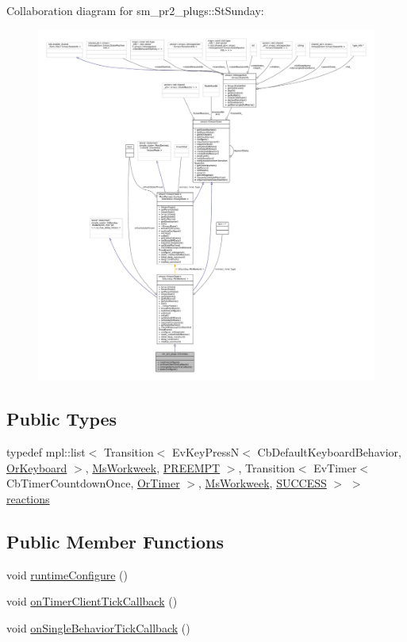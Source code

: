 Collaboration diagram for sm\+\_\+pr2\+\_\+plugs\+:\+:St\+Sunday\+:
\nopagebreak
\begin{figure}[H]
\begin{center}
\leavevmode
\includegraphics[width=350pt]{structsm__pr2__plugs_1_1StSunday__coll__graph}
\end{center}
\end{figure}
\subsection*{Public Types}
\begin{DoxyCompactItemize}
\item 
typedef mpl\+::list$<$ Transition$<$ Ev\+Key\+PressN$<$ Cb\+Default\+Keyboard\+Behavior, \hyperlink{classsm__pr2__plugs_1_1OrKeyboard}{Or\+Keyboard} $>$, \hyperlink{classsm__pr2__plugs_1_1MsWorkweek}{Ms\+Workweek}, \hyperlink{classPREEMPT}{P\+R\+E\+E\+M\+PT} $>$, Transition$<$ Ev\+Timer$<$ Cb\+Timer\+Countdown\+Once, \hyperlink{classsm__pr2__plugs_1_1OrTimer}{Or\+Timer} $>$, \hyperlink{classsm__pr2__plugs_1_1MsWorkweek}{Ms\+Workweek}, \hyperlink{classSUCCESS}{S\+U\+C\+C\+E\+SS} $>$ $>$ \hyperlink{structsm__pr2__plugs_1_1StSunday_acff71e969a008925b664a7eb033b457a}{reactions}
\end{DoxyCompactItemize}
\subsection*{Public Member Functions}
\begin{DoxyCompactItemize}
\item 
void \hyperlink{structsm__pr2__plugs_1_1StSunday_a184a3541f7e54fe67c17d078ef20dcde}{runtime\+Configure} ()
\item 
void \hyperlink{structsm__pr2__plugs_1_1StSunday_a8edc04f7306696db9c7a9972aaa5a2e0}{on\+Timer\+Client\+Tick\+Callback} ()
\item 
void \hyperlink{structsm__pr2__plugs_1_1StSunday_a2505ae6019aced0b23ba628e2be8b13a}{on\+Single\+Behavior\+Tick\+Callback} ()
\end{DoxyCompactItemize}
